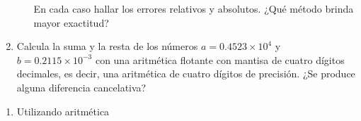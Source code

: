 \begin{frame}
\begin{enumerate}
\begin{enumerate}[a)]
                        En cada caso hallar los errores relativos y
                        absolutos.
                        ¿Qué método brinda mayor exactitud?
              \end{enumerate}

        \item

              Calcula la suma y la resta de los números
              $a=0.4523\times 10^{4}$ y $b=0.2115\times 10^{-3}$
              con una aritmética flotante con mantisa de cuatro
              dígitos decimales, es decir, una aritmética de cuatro
              dígitos de precisión.
              ¿Se produce alguna diferencia cancelativa?

              \saveenum
    \end{enumerate}
\end{frame}

\begin{frame}
    \begin{enumerate}
        \resume

        \item

              Utilizando aritmética
    \end{enumerate}
\end{frame}